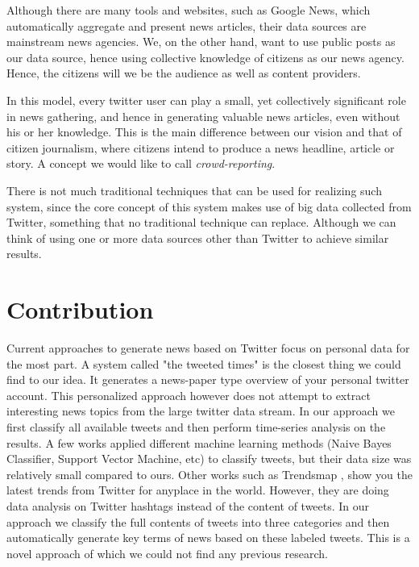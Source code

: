 \documentclass{llncs}
\begin{document}
Although there are many tools and websites, such as Google News, which automatically aggregate and present news articles, their data sources are  mainstream news agencies. We, on the other hand, want to use public posts as our data source, hence using collective knowledge of citizens as our news agency. Hence, the citizens will we be the audience as well as content providers.

In this model, every twitter user can play a small, yet collectively significant role in news gathering, and hence in generating valuable news articles, even without his or her knowledge. This is the main difference between our vision and that of citizen journalism, where citizens intend to produce a news headline, article or story. A concept we would like to call \textit{crowd-reporting}.

There is not much traditional techniques that can be used for realizing such system, since the core concept of this system makes use of big data collected from Twitter, something that no traditional technique can replace. Although we can think of using one or more data sources other than Twitter to achieve similar results.

\section{Contribution}
Current approaches to generate news based on Twitter focus on personal data for the most part. A system called "the tweeted times" \cite{tweeted-times} is the closest thing we could find to our idea. It generates a news-paper type overview of your personal twitter account. This personalized approach however does not attempt to extract interesting news topics from the large twitter data stream. In our approach we first classify all available tweets and then perform time-series analysis on the results. A few works \cite{Go_Bhayani_Huang_2009,twitter-classifier} applied different machine learning methods (Naive Bayes Classifier, Support Vector Machine, etc) to classify tweets, but their data size was relatively small compared to ours. Other works such as Trendsmap \cite{Trendmap}, show you the latest trends from Twitter for anyplace in the world. However, they are doing data analysis on Twitter hashtags instead of the content of tweets. In our approach we classify the full contents of tweets into three categories and then automatically generate key terms of news based on these labeled tweets. This is a novel approach of which we could not find any previous research.
\end{document}
